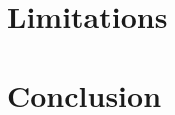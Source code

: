 \documentclass[letterpaper,12pt]{book}
\begin{document}
 
\section{Limitations}


\clearpage

\section{Conclusion}


\clearpage




\end{document}
